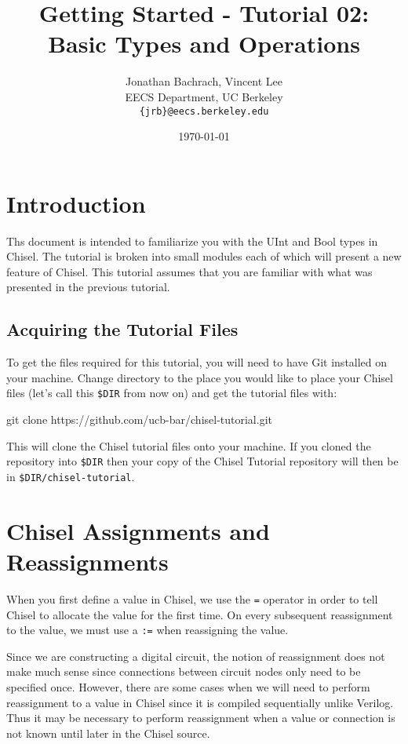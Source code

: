 \documentclass[twocolumn, 10pt]{article}
\title{Getting Started - Tutorial 02: Basic Types and Operations}
\author{Jonathan Bachrach, Vincent Lee \\
EECS Department, UC Berkeley\\
{\tt  \{jrb\}@eecs.berkeley.edu}
}
\date{\today}
\begin{document}
\maketitle{}


\section{Introduction}

Ths document is intended to familiarize you with the UInt and Bool types in Chisel.  The tutorial is broken into small modules each of which will present a new feature of Chisel. This tutorial assumes that you are familiar with what was presented in the previous tutorial.

\subsection{Acquiring the Tutorial Files}

To get the files required for this tutorial, you will need to have Git installed on your machine. Change directory to the place you would like to place your Chisel files (let's call this \verb+$DIR+ from now on) and get the tutorial files with:

\begin{bash}
git clone https://github.com/ucb-bar/chisel-tutorial.git
\end{bash}

This will clone the Chisel tutorial files onto your machine. If you cloned the repository into \verb+$DIR+ then your copy of the Chisel Tutorial repository will then be in \verb+$DIR/chisel-tutorial+.

\section{Chisel Assignments and Reassignments}

When you first define a value in Chisel, we use the \verb+=+ operator in order to tell Chisel to allocate the value for the first time. On every subsequent reassignment to the value, we must use a \verb+:=+ when reassigning the value.

Since we are constructing a digital circuit, the notion of reassignment does not make much sense since connections between circuit nodes only need to be specified once. However, there are some cases when we will need to perform reassignment to a value in Chisel since it is compiled sequentially unlike Verilog. Thus it may be necessary to perform reassignment when a value or connection is not known until later in the Chisel source. 
\end{document}
